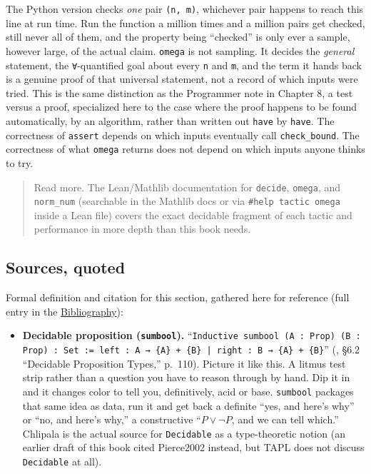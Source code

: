The Python version checks \emph{one} pair \texttt{(n, m)}, whichever pair happens to reach this line at run time. Run the function a million times and a million pairs get checked, still never all of them, and the property being ``checked'' is only ever a sample, however large, of the actual claim. \texttt{omega} is not sampling. It decides the \emph{general} statement, the \texttt{∀}-quantified goal about every \texttt{n} and \texttt{m}, and the term it hands back is a genuine proof of that universal statement, not a record of which inputs were tried. This is the same distinction as the Programmer note in Chapter 8, a test versus a proof, specialized here to the case where the proof happens to be found automatically, by an algorithm, rather than written out \texttt{have} by \texttt{have}. The correctness of \texttt{assert} depends on which inputs eventually call \texttt{check\_\allowbreak{}bound}. The correctness of what \texttt{omega} returns does not depend on which inputs anyone thinks to try.

\begin{quote}
Read more. The Lean/Mathlib documentation for \texttt{decide}, \texttt{omega}, and \texttt{norm\_\allowbreak{}num} (searchable in the Mathlib docs or via \texttt{\#help tactic omega} inside a Lean file) covers the exact decidable fragment of each tactic and performance in more depth than this book needs.
\end{quote}

\subsection{Sources, quoted}\label{sec:13-working-efficiently:02-decision-procedures:2}

Formal definition and citation for this section, gathered here for reference (full entry in the \hyperref[sec:root:bibliography:1]{Bibliography}):

\begin{itemize}
\tightlist
\item
  \textbf{Decidable proposition (\texttt{sumbool}).} ``\texttt{Inductive sumbool (A : Prop) (B : Prop) : Set := left : A → \{A\} + \{B\} | right : B → \{A\} + \{B\}}'' (\cite{Chlipala2013}, §6.2 ``Decidable Proposition Types,'' p.~110). Picture it like this. A litmus test strip rather than a question you have to reason through by hand. Dip it in and it changes color to tell you, definitively, acid or base. \texttt{sumbool} packages that same idea as data, run it and get back a definite ``yes, and here's why'' or ``no, and here's why,'' a constructive ``\(P \vee \neg P\), and we can tell which.'' Chlipala is the actual source for \texttt{Decidable} as a type-theoretic notion (an earlier draft of this book cited Pierce2002 instead, but TAPL does not discuss \texttt{Decidable} at all).
\end{itemize}
